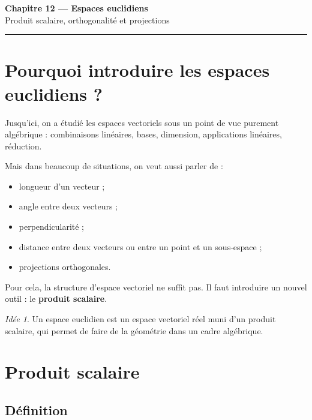 \documentclass[11pt,a4paper]{article}
\theoremstyle{remark}
\newtheorem*{idee}{Idée}
\begin{document}
\begin{center}
    {\LARGE \textbf{Chapitre 12 --- Espaces euclidiens}}\\[0.4em]
    {\large Produit scalaire, orthogonalité et projections}
\end{center}

\hrule
\vspace{1em}

\tableofcontents

\newpage

\section{Pourquoi introduire les espaces euclidiens ?}

Jusqu’ici, on a étudié les espaces vectoriels sous un point de vue purement algébrique : combinaisons linéaires, bases, dimension, applications linéaires, réduction.

Mais dans beaucoup de situations, on veut aussi parler de :
\begin{itemize}
    \item longueur d’un vecteur ;
    \item angle entre deux vecteurs ;
    \item perpendicularité ;
    \item distance entre deux vecteurs ou entre un point et un sous-espace ;
    \item projections orthogonales.
\end{itemize}

Pour cela, la structure d’espace vectoriel ne suffit pas. Il faut introduire un nouvel outil : le \textbf{produit scalaire}.

\begin{idee}
Un espace euclidien est un espace vectoriel réel muni d’un produit scalaire, qui permet de faire de la géométrie dans un cadre algébrique.
\end{idee}

\section{Produit scalaire}

\subsection{Définition}
\end{document}
